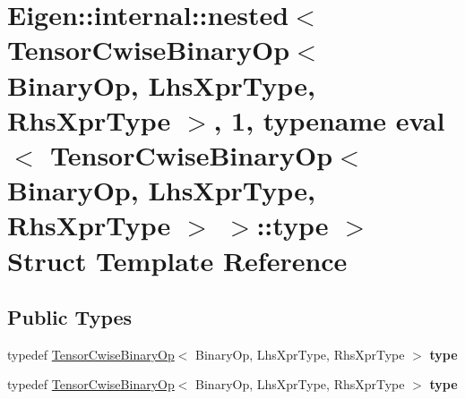 \hypertarget{struct_eigen_1_1internal_1_1nested_3_01_tensor_cwise_binary_op_3_01_binary_op_00_01_lhs_xpr_typec43a72cea85b54495a72d72517229ff1}{}\section{Eigen\+:\+:internal\+:\+:nested$<$ Tensor\+Cwise\+Binary\+Op$<$ Binary\+Op, Lhs\+Xpr\+Type, Rhs\+Xpr\+Type $>$, 1, typename eval$<$ Tensor\+Cwise\+Binary\+Op$<$ Binary\+Op, Lhs\+Xpr\+Type, Rhs\+Xpr\+Type $>$ $>$\+:\+:type $>$ Struct Template Reference}
\label{struct_eigen_1_1internal_1_1nested_3_01_tensor_cwise_binary_op_3_01_binary_op_00_01_lhs_xpr_typec43a72cea85b54495a72d72517229ff1}
\subsection*{Public Types}
\begin{DoxyCompactItemize}
\item 
\mbox{\label{struct_eigen_1_1internal_1_1nested_3_01_tensor_cwise_binary_op_3_01_binary_op_00_01_lhs_xpr_typec43a72cea85b54495a72d72517229ff1_a32ce60f18e411381efc61be954d65fc5}} 
typedef \hyperlink{class_eigen_1_1_tensor_cwise_binary_op}{Tensor\+Cwise\+Binary\+Op}$<$ Binary\+Op, Lhs\+Xpr\+Type, Rhs\+Xpr\+Type $>$ {\bfseries type}
\item 
\mbox{\label{struct_eigen_1_1internal_1_1nested_3_01_tensor_cwise_binary_op_3_01_binary_op_00_01_lhs_xpr_typec43a72cea85b54495a72d72517229ff1_a32ce60f18e411381efc61be954d65fc5}} 
typedef \hyperlink{class_eigen_1_1_tensor_cwise_binary_op}{Tensor\+Cwise\+Binary\+Op}$<$ Binary\+Op, Lhs\+Xpr\+Type, Rhs\+Xpr\+Type $>$ {\bfseries type}
\end{DoxyCompactItemize}


